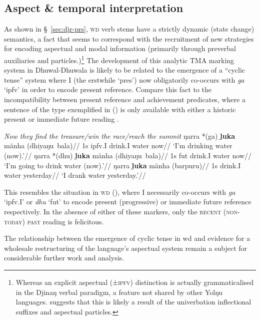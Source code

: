 \subsection{Aspect \& temporal interpretation}
As shown in \S~\ref{sec:djr-prs}, \textsc{wd} verb stems have a strictly dynamic (state change) semantics, a fact that seems to correspond with the recruitment of new strategies for encoding aspectual and modal information (primarily through preverbal auxiliaries and particles.)\footnote{Whereas an explicit aspectual (±\textsc{ipfv}) distinction is actually grammaticalised in the Djinaŋ verbal paradigm, a feature not shared by other Yolŋu languages. \citet{Bowern2009} suggests that this is likely a result of the univerbation inflectional suffixes and aspectual particles.} The development of this analytic TMA marking system in Dhuwal-Dhuwala is likely to be related to the emergence of a ``cyclic tense'' system where \gls{I} (the erstwhile `\gls{pres}') now obligatorily co-occurs with \textit{ga} `\gls{ipfv}' in order to encode present reference. Compare this fact to the incompatibility between present reference and achievement predicates, where a sentence of the type exemplified in (\nextx) is only available with either a historic present or immediate future reading \citep[an observation following][147]{Vendler1957}.


\pex\textit{Now they find the treasure/win the race/reach the summit}\xe
\pex\a\begingl\gla ŋarra *(ga) \textbf{ḻuka} mänha (dhiyaŋu~bala)//
\glb 1s \gls{ipfv}.\gls{I} drink.\gls{I} water now//
\glft`I'm drinking water (now).'\trailingcitation{[DB~20190405]}//\endgl
\a\begingl\gla ŋarra *(dhu) \textbf{ḻuka} mänha (dhiyaŋu~bala)//
\glb 1s \gls{fut} drink.\gls{I} water now//
\glft`I'm going to drink water (now).'\trailingcitation{[DB~20190405]}//\endgl
\a\begingl\gla ŋarra \textbf{ḻuka} mänha (barpuru)//
\glb 1s drink.\gls{I} water yesterday//
\glft`I drank water yesterday.'\trailingcitation{[DB~20190405]}//\endgl

\xe

This resembles the situation in \textsc{wd} (), where \gls{I} necessarily co-occurs with \textit{ga} `\gls{ipfv}.\gls{I}' or \textit{dhu} `\gls{fut}' to encode present (progressive) or immediate future reference respectively. In the absence of either of these markers, only the \textsc{recent (non-today) past} reading is felicitous.

The relationship between the emergence of cyclic tense in \gls{wd} and evidence for a wholesale restructuring of the language's aspectual system remain a subject for considerable further work and analysis.

